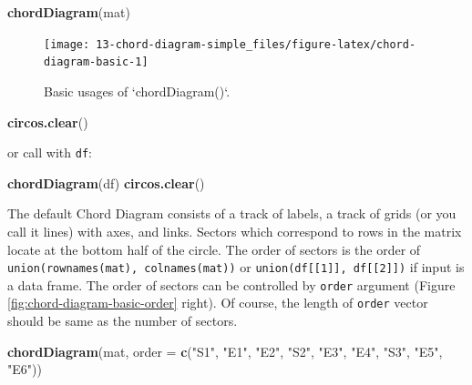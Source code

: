 \documentclass[]{book}
\newenvironment{Shaded}{\begin{snugshade}}{\end{snugshade}}
\newcommand{\KeywordTok}[1]{\textcolor[rgb]{0.13,0.29,0.53}{\textbf{#1}}}
\newcommand{\DataTypeTok}[1]{\textcolor[rgb]{0.13,0.29,0.53}{#1}}
\newcommand{\StringTok}[1]{\textcolor[rgb]{0.31,0.60,0.02}{#1}}
\newcommand{\NormalTok}[1]{#1}
\theoremstyle{definition}
\theoremstyle{definition}
\theoremstyle{remark}
\begin{document}
\begin{Shaded}
\begin{Highlighting}[]
\KeywordTok{chordDiagram}\NormalTok{(mat)}
\end{Highlighting}
\end{Shaded}

\begin{figure}

{\centering \texttt{[image: 13-chord-diagram-simple\_files/figure-latex/chord-diagram-basic-1]} 

}

\caption{Basic usages of `chordDiagram()`.}\label{fig:chord-diagram-basic}
\end{figure}

\begin{Shaded}
\begin{Highlighting}[]
\KeywordTok{circos.clear}\NormalTok{()}
\end{Highlighting}
\end{Shaded}

or call with \texttt{df}:

\begin{Shaded}
\begin{Highlighting}[]
\KeywordTok{chordDiagram}\NormalTok{(df)}
\KeywordTok{circos.clear}\NormalTok{()}
\end{Highlighting}
\end{Shaded}

The default Chord Diagram consists of a track of labels, a track of
grids (or you call it lines) with axes, and links. Sectors which
correspond to rows in the matrix locate at the bottom half of the
circle. The order of sectors is the order of
\texttt{union(rownames(mat),\ colnames(mat))} or
\texttt{union(df{[}{[}1{]}{]},\ df{[}{[}2{]}{]})} if input is a data
frame. The order of sectors can be controlled by \texttt{order} argument
(Figure \ref{fig:chord-diagram-basic-order} right). Of course, the
length of \texttt{order} vector should be same as the number of sectors.

\begin{Shaded}
\begin{Highlighting}[]
\KeywordTok{chordDiagram}\NormalTok{(mat, }\DataTypeTok{order =} \KeywordTok{c}\NormalTok{(}\StringTok{"S1"}\NormalTok{, }\StringTok{"E1"}\NormalTok{, }\StringTok{"E2"}\NormalTok{, }\StringTok{"S2"}\NormalTok{, }\StringTok{"E3"}\NormalTok{, }\StringTok{"E4"}\NormalTok{, }\StringTok{"S3"}\NormalTok{, }\StringTok{"E5"}\NormalTok{, }\StringTok{"E6"}\NormalTok{))}
\end{Highlighting}
\end{Shaded}
\end{document}
